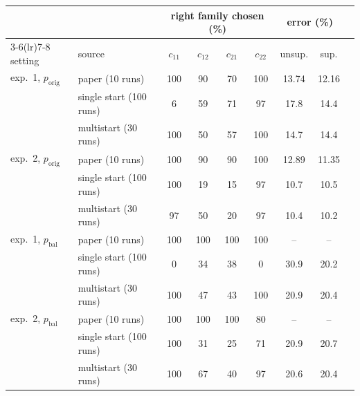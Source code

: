 \begin{tabular}{llccccccc}
\toprule
 & & \multicolumn{4}{c}{right family chosen (\%)} & \multicolumn{2}{c}{error (\%)} \\
\cmidrule(lr){3-6}\cmidrule(lr){7-8}
setting & source & $c_{11}$ & $c_{12}$ & $c_{21}$ & $c_{22}$ & unsup. & sup. \\
\midrule
exp.~1, $p_{\text{orig}}$ & paper (10 runs) & 100 & 90 & 70 & 100 & 13.74 & 12.16 \\
 & single start (100 runs) & 6 & 59 & 71 & 97 & 17.8 & 14.4 \\
 & multistart (30 runs) & 100 & 50 & 57 & 100 & 14.7 & 14.4 \\
\addlinespace
exp.~2, $p_{\text{orig}}$ & paper (10 runs) & 100 & 90 & 90 & 100 & 12.89 & 11.35 \\
 & single start (100 runs) & 100 & 19 & 15 & 97 & 10.7 & 10.5 \\
 & multistart (30 runs) & 97 & 50 & 20 & 97 & 10.4 & 10.2 \\
\addlinespace
exp.~1, $p_{\text{bal}}$ & paper (10 runs) & 100 & 100 & 100 & 100 & -- & -- \\
 & single start (100 runs) & 0 & 34 & 38 & 0 & 30.9 & 20.2 \\
 & multistart (30 runs) & 100 & 47 & 43 & 100 & 20.9 & 20.4 \\
\addlinespace
exp.~2, $p_{\text{bal}}$ & paper (10 runs) & 100 & 100 & 100 & 80 & -- & -- \\
 & single start (100 runs) & 100 & 31 & 25 & 71 & 20.9 & 20.7 \\
 & multistart (30 runs) & 100 & 67 & 40 & 97 & 20.6 & 20.4 \\
\bottomrule
\end{tabular}
